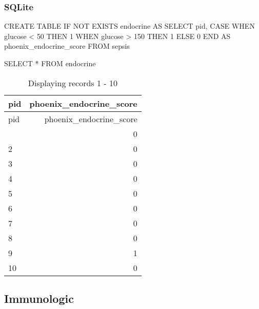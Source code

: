 \documentclass[
  letterpaper,
  DIV=11,
  numbers=noendperiod]{scrartcl}
\newenvironment{Shaded}{\begin{snugshade}}{\end{snugshade}}
\newcommand{\ControlFlowTok}[1]{\textcolor[rgb]{0.00,0.23,0.31}{#1}}
\newcommand{\DecValTok}[1]{\textcolor[rgb]{0.68,0.00,0.00}{#1}}
\newcommand{\KeywordTok}[1]{\textcolor[rgb]{0.00,0.23,0.31}{#1}}
\newcommand{\NormalTok}[1]{\textcolor[rgb]{0.00,0.23,0.31}{#1}}
\newcommand{\OperatorTok}[1]{\textcolor[rgb]{0.37,0.37,0.37}{#1}}
\begin{document}
\subsubsection{SQLite}\label{sqlite-4}

\begin{Shaded}
\begin{Highlighting}[]
\KeywordTok{CREATE} \KeywordTok{TABLE} \ControlFlowTok{IF} \KeywordTok{NOT} \KeywordTok{EXISTS}\NormalTok{ endocrine }\KeywordTok{AS}
\KeywordTok{SELECT}
\NormalTok{  pid,}
  \ControlFlowTok{CASE} \ControlFlowTok{WHEN}\NormalTok{ glucose }\OperatorTok{\textless{}}  \DecValTok{50} \ControlFlowTok{THEN} \DecValTok{1}
       \ControlFlowTok{WHEN}\NormalTok{ glucose }\OperatorTok{\textgreater{}} \DecValTok{150} \ControlFlowTok{THEN} \DecValTok{1}
       \ControlFlowTok{ELSE} \DecValTok{0} \ControlFlowTok{END} \KeywordTok{AS}\NormalTok{ phoenix\_endocrine\_score}
\KeywordTok{FROM}\NormalTok{ sepsis}
\end{Highlighting}
\end{Shaded}

\begin{Shaded}
\begin{Highlighting}[]
\KeywordTok{SELECT} \OperatorTok{*} \KeywordTok{FROM}\NormalTok{ endocrine}
\end{Highlighting}
\end{Shaded}

\begin{longtable}[]{@{}lr@{}}
\caption{Displaying records 1 - 10}\tabularnewline
\toprule\noalign{}
pid & phoenix\_endocrine\_score \\
\midrule\noalign{}
\endfirsthead
\toprule\noalign{}
pid & phoenix\_endocrine\_score \\
\midrule\noalign{}
\endhead
\bottomrule\noalign{}
\endlastfoot
1 & 0 \\
2 & 0 \\
3 & 0 \\
4 & 0 \\
5 & 0 \\
6 & 0 \\
7 & 0 \\
8 & 0 \\
9 & 1 \\
10 & 0 \\
\end{longtable}

\subsection{Immunologic}\label{immunologic}
\end{document}
